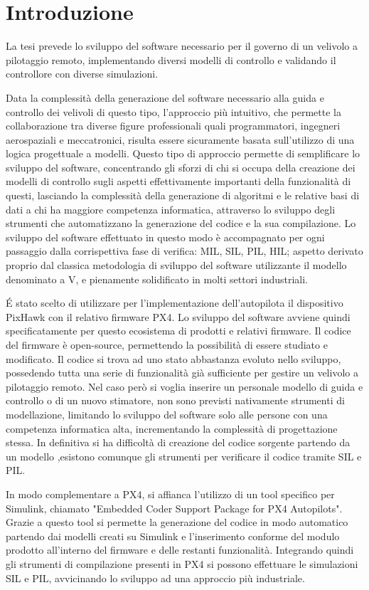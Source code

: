 \chapter{Introduzione}
La tesi prevede lo sviluppo del software necessario per il governo di un velivolo a pilotaggio remoto, implementando diversi modelli di controllo e validando il controllore con diverse simulazioni.

Data la complessità della generazione del software necessario alla guida e controllo dei velivoli di questo tipo, l'approccio più intuitivo, che permette la collaborazione tra diverse figure professionali quali programmatori, ingegneri aerospaziali e meccatronici, risulta essere sicuramente basata sull'utilizzo di una logica progettuale a modelli. Questo tipo di approccio permette di semplificare lo sviluppo del software, concentrando gli sforzi di chi si occupa della creazione dei modelli di controllo sugli aspetti effettivamente importanti della funzionalità di questi, lasciando la complessità della generazione di algoritmi e le relative basi di dati a chi ha maggiore competenza informatica, attraverso lo sviluppo degli strumenti che automatizzano la generazione del codice e la sua compilazione. 
Lo sviluppo del software effettuato in questo modo è accompagnato per ogni passaggio dalla corrispettiva fase di verifica: MIL, SIL, PIL, HIL; aspetto derivato proprio dal classica metodologia di sviluppo del software utilizzante il modello denominato a V, e pienamente solidificato in molti settori industriali.

\'E stato scelto di utilizzare per l'implementazione dell'autopilota il dispositivo PixHawk con il relativo firmware PX4. Lo sviluppo del software avviene quindi specificatamente per questo ecosistema di prodotti e relativi firmware. Il codice del firmware è open-source, permettendo la possibilità di essere studiato e modificato. Il codice si trova ad uno stato abbastanza evoluto nello sviluppo, possedendo tutta una serie di funzionalità già sufficiente per gestire un velivolo a pilotaggio remoto. Nel caso però si voglia inserire un personale modello di guida e controllo o di un nuovo stimatore, non sono previsti nativamente strumenti di modellazione, limitando lo sviluppo del software solo alle persone con una competenza informatica alta, incrementando la complessità di progettazione stessa. In definitiva si ha difficoltà di creazione del codice sorgente partendo da un modello ,esistono comunque gli strumenti per verificare il codice tramite SIL e PIL.

In modo complementare a PX4, si affianca l'utilizzo di un tool specifico per Simulink, chiamato "Embedded Coder Support Package
for PX4 Autopilots". Grazie a questo tool si permette la generazione del codice in modo automatico partendo dai modelli creati su Simulink e l'inserimento conforme del modulo prodotto all'interno del firmware e delle restanti funzionalità. Integrando quindi gli strumenti di compilazione presenti in PX4 si possono effettuare le simulazioni SIL e PIL, avvicinando lo sviluppo ad una approccio più industriale.

